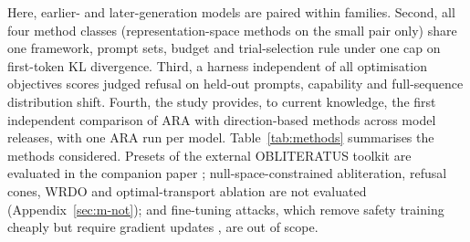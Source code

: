 Here, earlier- and later-generation models are
paired within families. Second, all four method classes (representation-space
methods on the small pair only) share one framework, prompt sets, budget and
trial-selection rule under one cap on first-token KL divergence. Third, a harness independent of all optimisation
objectives scores judged refusal on held-out prompts, capability and
full-sequence distribution shift. Fourth, the study provides, to current
knowledge, the first independent comparison of ARA with direction-based
methods across model releases, with one ARA run per model.
Table~\ref{tab:methods} summarises the methods considered. Presets of the
external OBLITERATUS toolkit are evaluated in the companion paper
\cite{young2026paper30}; null-space-constrained
abliteration, refusal cones, WRDO and optimal-transport ablation are not
evaluated (Appendix~\ref{sec:m-not}); and fine-tuning attacks, which remove
safety training cheaply but require gradient updates
\cite{qi2024finetuning,lermen2023lora}, are out of scope.

